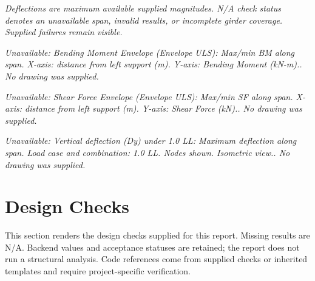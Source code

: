 \documentclass[12pt,a4paper]{report}
\numberwithin{table}{chapter}
\numberwithin{figure}{chapter}
\newcommand{\ReportTableGap}{\vspace{0.5em}}
\begin{document}
\ReportTableGap
\noindent\textit{Deflections are maximum available supplied magnitudes. N/A check status denotes an unavailable span, invalid results, or incomplete girder coverage. Supplied failures remain visible.}
\par
\noindent
\noindent\textit{Unavailable: Bending Moment Envelope (Envelope ULS):\allowbreak{} Max/min BM along span. X-axis:\allowbreak{} distance from left support (m). Y-axis:\allowbreak{} Bending Moment (kN-m).. No drawing was supplied.}\par

\noindent\textit{Unavailable: Shear Force Envelope (Envelope ULS):\allowbreak{} Max/min SF along span. X-axis:\allowbreak{} distance from left support (m). Y-axis:\allowbreak{} Shear Force (kN).. No drawing was supplied.}\par

\noindent\textit{Unavailable: Vertical deflection (Dy) under 1.0 LL:\allowbreak{} Maximum deflection along span. Load case and combination:\allowbreak{} 1.0 LL. Nodes shown. Isometric view.. No drawing was supplied.}\par


\setcounter{chapter}{4}
\chapter{Design Checks}

This section renders the design checks supplied for this report. Missing results are N/A. Backend values and acceptance statuses are retained; the report does not run a structural analysis. Code references come from supplied checks or inherited templates and require project-specific verification.
\end{document}
